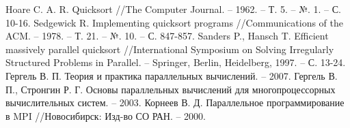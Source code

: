 \documentclass{report}
\begin{document}
\begin{thebibliography}{1}
Hoare C. A. R. Quicksort //The Computer Journal. – 1962. – Т. 5. – №. 1. – С. 10-16.
Sedgewick R. Implementing quicksort programs //Communications of the ACM. – 1978. – Т. 21. – №. 10. – С. 847-857.
Sanders P., Hansch T. Efficient massively parallel quicksort //International Symposium on Solving Irregularly Structured Problems in Parallel. – Springer, Berlin, Heidelberg, 1997. – С. 13-24.
Гергель В. П. Теория и практика параллельных вычислений. – 2007.
Гергель В. П., Стронгин Р. Г. Основы параллельных вычислений для многопроцессорных вычислительных систем. – 2003.
Корнеев В. Д. Параллельное программирование в MPI //Новосибирск: Изд-во СО РАН. – 2000.
\end{thebibliography}
\newpage

\end{document}
